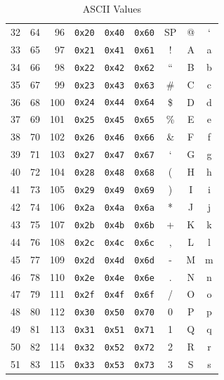 \documentclass[12pt]{article}
\begin{document}
	\begin{table}[H]
	\begin{minipage}[t]{.55\linewidth}
	\centering
	\caption{ASCII Values \label{tab:ASCII}}
	\begin{tabular}{rrr | rrr | ccc}\hline
	32 & 64 & 96	& \texttt{0x20} & \texttt{0x40} & \texttt{0x60}	& SP		& @	& `\\
	33 & 65 & 97	& \texttt{0x21} & \texttt{0x41} & \texttt{0x61}	& ! 		& A 	& a\\
	34 & 66 & 98	& \texttt{0x22} & \texttt{0x42} & \texttt{0x62}	& ``		& B 	& b\\
	35 & 67 & 99	& \texttt{0x23} & \texttt{0x43} & \texttt{0x63}	& \#		& C 	& c\\
	36 & 68 & 100	& \texttt{0x24} & \texttt{0x44} & \texttt{0x64}	& \$		& D 	& d\\
	37 & 69 & 101	& \texttt{0x25} & \texttt{0x45} & \texttt{0x65}	& \%		& E 	& e\\
	38 & 70 & 102	& \texttt{0x26} & \texttt{0x46} & \texttt{0x66} 	& \&		& F 	& f\\
	39 & 71 & 103	& \texttt{0x27} & \texttt{0x47} & \texttt{0x67}	& `		& G 	& g\\
	40 & 72 & 104	& \texttt{0x28} & \texttt{0x48} & \texttt{0x68}	& (		& H 	& h\\
	41 & 73 & 105 	& \texttt{0x29} & \texttt{0x49} & \texttt{0x69} 	& )		& I 	& i\\
	42 & 74 & 106	& \texttt{0x2a} & \texttt{0x4a} & \texttt{0x6a}	& *		& J	& j\\
	43 & 75 & 107	& \texttt{0x2b} & \texttt{0x4b} & \texttt{0x6b} 	& +		& K	& k\\
	44 & 76 & 108	& \texttt{0x2c} & \texttt{0x4c} & \texttt{0x6c}	& ,		& L 	& l\\
	45 & 77 & 109	& \texttt{0x2d} & \texttt{0x4d} & \texttt{0x6d}	& - 		& M 	& m\\
	46 & 78 & 110	& \texttt{0x2e} & \texttt{0x4e} & \texttt{0x6e}	& .		& N 	& n\\
	47 & 79 & 111	& \texttt{0x2f} & \texttt{0x4f} & \texttt{0x6f}	& /		& O	& o\\
	48 & 80 & 112	& \texttt{0x30} & \texttt{0x50} & \texttt{0x70}	& 0		& P 	& p\\
	49 & 81 & 113	& \texttt{0x31} & \texttt{0x51} & \texttt{0x71}	& 1		& Q 	& q\\
	50 & 82 & 114	& \texttt{0x32} & \texttt{0x52} & \texttt{0x72}	& 2		& R 	& r\\
	51 & 83 & 115	& \texttt{0x33} & \texttt{0x53} & \texttt{0x73}	& 3		& S 	& s\\

\end{tabular}
\end{minipage}
\end{table}
\end{document}
